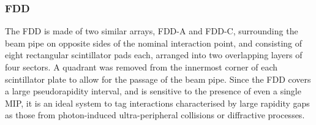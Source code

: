 \subsubsection{FDD}
The FDD is made of two similar arrays, FDD-A and FDD-C, surrounding the beam pipe on opposite sides of the nominal interaction point, and consisting of eight rectangular scintillator pads each, arranged into two overlapping layers of four sectors. A quadrant was removed from the innermost corner of each scintillator plate to allow for the passage of the beam pipe. Since the FDD covers a large pseudorapidity interval, and is sensitive to the presence of even a single MIP, it is an ideal system to tag interactions characterised by large rapidity gaps as those from photon-induced ultra-peripheral collisions or diffractive processes.